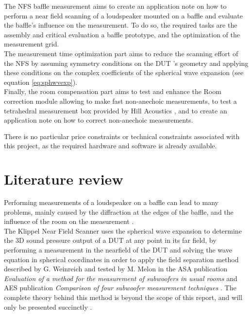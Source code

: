 \documentclass{report}
\begin{document}
The NFS baffle measurement aims to create an application note on how to perform a near field scanning of a loudspeaker mounted on a baffle and evaluate the baffle's influence on the measurement. To do so, the required tasks are the assembly and critical evaluation a baffle prototype, and the optimization of the measurement grid.\\
The measurement time optimization part aims to reduce the scanning effort of the NFS by assuming symmetry conditions on the DUT 's geometry and applying these conditions on the complex coefficients of the spherical wave expansion (see equation \ref{eq:sphwvexp}). \\
Finally, the room compensation part aims to test and enhance the Room correction module allowing to make fast non-anechoic measurements, to test a tetrahedral measurement box provided by Hill Acoustics \citep[see][]{tetbox}, and to create an application note on how to correct non-anechoic measurements. \\

There is no particular price constraints or technical constraints associated with this project, as the required hardware and software is already available. 

\newpage

\section{Literature review}

Performing measurements of a loudspeaker on a baffle can lead to many problems, mainly caused by the diffraction at the edges of the baffle, and the influence of the room on the measurement \cite{LIS}.\\
The Klippel Near Field Scanner uses the spherical wave expansion to determine the 3D sound pressure output of a DUT at any point in its far field, by performing a measurement in the nearfield of the DUT and solving the wave equation in spherical coordinates in order to apply the field separation method described by G. Weinreich and tested by M. Melon in the ASA publication \textit{Evaluation of a method for the measurement of subwoofers in usual rooms} and AES publication \textit{Comparison of four subwoofer measurement techniques}  \cite{melon1, melon2}. The complete theory behind this method is beyond the scope of this report, and will only be presented succinctly \citep[see][sect.~3]{aeshs} \citep[see][chap.~6]{Fourier}. 
\end{document}
